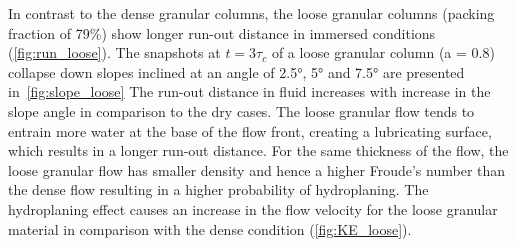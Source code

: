 In contrast to the dense granular columns, the loose granular columns (packing 
fraction of 79\%) show longer run-out distance in immersed conditions 
(\cref{fig:run_loose}). The snapshots at $t = 3\tau_c$ of a loose granular 
column (a = 0.8) collapse down slopes inclined at an angle of 2.5\si{\degree}, 
5\si{\degree} and 7.5\si{\degree} are presented in~\cref{fig:slope_loose} The 
run-out distance 
in fluid increases with increase in the slope angle in comparison to the dry 
cases. The loose granular flow tends to entrain more water at the base of the 
flow front, creating a lubricating surface, which results in a longer run-out 
distance. For the same thickness of the flow, 
the loose granular flow has smaller density and hence a higher Froude's number 
than the dense flow resulting in a higher probability of hydroplaning. The 
hydroplaning effect causes an increase in the flow velocity for the loose 
granular material in comparison with the dense condition 
(\cref{fig:KE_loose}).

